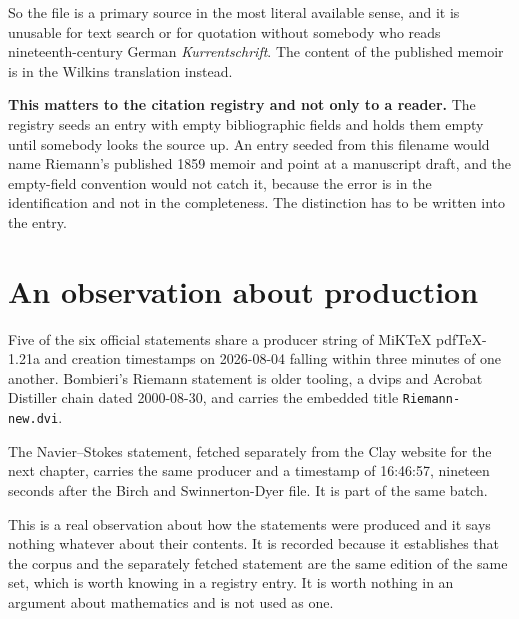 So the file is a primary source in the most literal available sense, and it is unusable for text
search or for quotation without somebody who reads nineteenth-century German
\emph{Kurrentschrift}. The content of the published memoir is in the Wilkins translation instead.

\textbf{This matters to the citation registry and not only to a reader.} The registry seeds an
entry with empty bibliographic fields and holds them empty until somebody looks the source up. An
entry seeded from this filename would name Riemann's published 1859 memoir and point at a
manuscript draft, and the empty-field convention would not catch it, because the error is in the
identification and not in the completeness. The distinction has to be written into the entry.

\section{An observation about production}

Five of the six official statements share a producer string of MiKTeX pdfTeX-1.21a and creation
timestamps on 2026-08-04 falling within three minutes of one another. Bombieri's Riemann statement
is older tooling, a dvips and Acrobat Distiller chain dated 2000-08-30, and carries the embedded
title \texttt{Riemann-new.dvi}.

The Navier--Stokes statement, fetched separately from the Clay website for the next chapter, carries
the same producer and a timestamp of 16:46:57, nineteen seconds after the Birch and
Swinnerton-Dyer file. It is part of the same batch.

This is a real observation about how the statements were produced and it says nothing whatever
about their contents. It is recorded because it establishes that the corpus and the separately
fetched statement are the same edition of the same set, which is worth knowing in a registry entry.
It is worth nothing in an argument about mathematics and is not used as one.
